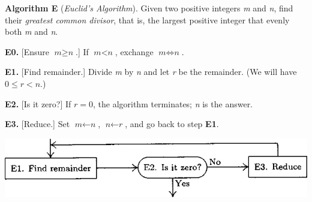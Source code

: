 ﻿\documentclass{article}
\begin{document}
\begin{flushleft}
\textbf{Algorithm E} (\textit{Euclid's Algorithm}). Given two positive integers \textit{m} and \textit{n}, find their \textit{greatest common divisor}, that is, the largest positive integer that evenly both \textit{m} and \textit{n}.
\vspace{4mm}
\par \textbf{E0.} [Ensure $\textit{m}\geq\textit{n}$.] If $\textit{m}<\textit{n}$, exchange $\textit{m}\Leftrightarrow\textit{n}$.
\vspace{2mm}
\par \textbf{E1.} [Find  remainder.] Divide \textit{m} by \textit{n} and let \textit{r} be the remainder. (We will have $0\leq\textit{r}<\textit{n}$.)
\vspace{2mm}
\par \textbf{E2.} [Is it zero?] If $\textit{r}=0$, the algorithm terminates; \textit{n} is the answer.
\vspace{2mm}
\par \textbf{E3.} [Reduce.] Set $\textit{m}\gets\textit{n}$, $\textit{n}\gets\textit{r}$, and go back to step \textbf{E1}.
\vspace{3mm}
\par \includegraphics[width=\textwidth]{scheme}
\end{flushleft}
\end{document}

